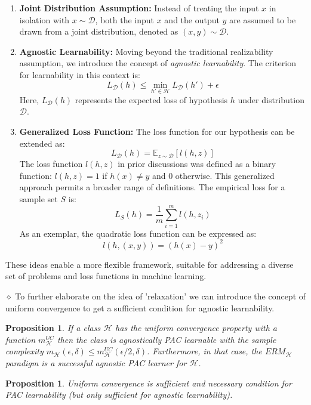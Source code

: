 \documentclass{article}
\newtheorem{proposition}[theorem]{Proposition}
\theoremstyle{remark}
\begin{document}
    \begin{enumerate}
        \item \textbf{Joint Distribution Assumption:} 
        Instead of treating the input \(x\) in isolation with \(x \sim \mathcal{D}\), both the input \(x\) and the output \(y\) are assumed to be drawn from a joint distribution, denoted as \((x,y) \sim \mathcal{D}\).
    
        \item \textbf{Agnostic Learnability:}
        Moving beyond the traditional realizability assumption, we introduce the concept of \textit{agnostic learnability}. The criterion for learnability in this context is:
        \[
        L_\mathcal{D}(h) \leq \min_{h' \in \mathcal{H}} L_\mathcal{D}(h') + \epsilon
        \]
        Here, \(L_\mathcal{D}(h)\) represents the expected loss of hypothesis \(h\) under distribution \(\mathcal{D}\).
    
        \item \textbf{Generalized Loss Function:}
        The loss function for our hypothesis can be extended as:
        \[
        L_\mathcal{D}(h) = \mathbb{E}_{z \sim \mathcal{D}} [l(h, z)]
        \]
        The loss function \(l(h,z)\) in prior discussions was defined as a binary function: \(l(h,z) = 1\) if \(h(x) \neq y\) and \(0\) otherwise. This generalized approach permits a broader range of definitions. The empirical loss for a sample set \(S\) is:
        \[
        L_S(h) = \frac{1}{m} \sum_{i=1}^{m} l(h, z_i)
        \]
        As an exemplar, the quadratic loss function can be expressed as:
        \[
        l(h, (x,y)) = (h(x) - y)^2
        \]
    \end{enumerate}
    
    These ideas enable a more flexible framework, suitable for addressing a diverse set of problems and loss functions in machine learning.

    $\diamond$ To further elaborate on the idea of 'relaxation' we can introduce the concept of uniform convergence to get a sufficient condition for agnostic learnability.

    \begin{proposition}
    If a class $\mathcal{H}$ has the uniform convergence property with a function $m^{UC}_{\mathcal{H}}$ then the class is agnostically
     PAC learnable with the sample complexity $m_{\mathcal{H}}(\epsilon,\delta)\leq m^{UC}_{\mathcal{H}}(\epsilon/2,\delta)$. Furthermore, in that case, the $ERM_{\mathcal{H}}$ paradigm is a successful 
     agnostic PAC learner for $\mathcal{H}$.
    \end{proposition}
    \begin{proposition}
    Uniform convergence is sufficient and necessary condition for PAC learnability (but only sufficient for agnostic learnability).
    \end{proposition}
\end{document}
